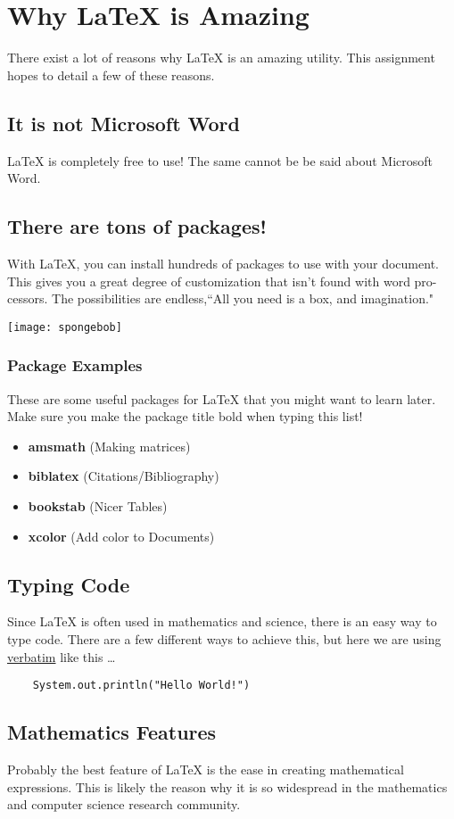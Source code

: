 \section{Why LaTeX is Amazing}
There exist a lot of reasons why LaTeX is an amazing utility. This assignment hopes to detail a few of these reasons.

\subsection{It is not Microsoft Word}
LaTeX is completely free to use! The same cannot be be said about Microsoft Word.

\subsection{There are tons of packages!}
With LaTeX, you can install hundreds of packages to use with your document. This gives you a great degree of customization that isn't found with word pro-cessors. The possibilities are endless,``All you need is a box, and imagination."

\begin{center}
    \texttt{[image: spongebob]}
\end{center}

\subsubsection{Package Examples}
These are some useful packages for LaTeX that you might want to learn later. Make sure you make the package title bold when typing this list!

\begin{itemize}
\item \textbf{amsmath} (Making matrices)
\item \textbf{biblatex} (Citations/Bibliography)
\item \textbf{bookstab} (Nicer Tables)
\item \textbf{xcolor} (Add color to Documents)
\end{itemize}

\subsection{Typing Code}
Since LaTeX is often used in mathematics and science, there is an easy way to type code. There are a few different ways to achieve this, but here we are using \underline{verbatim} like this \ldots{}

\begin{verbatim}
    System.out.println("Hello World!")
\end{verbatim}

\subsection{Mathematics Features}
Probably the best feature of LaTeX is the ease in creating mathematical expressions. This is likely the reason why it is so widespread in the mathematics and computer science research community.
